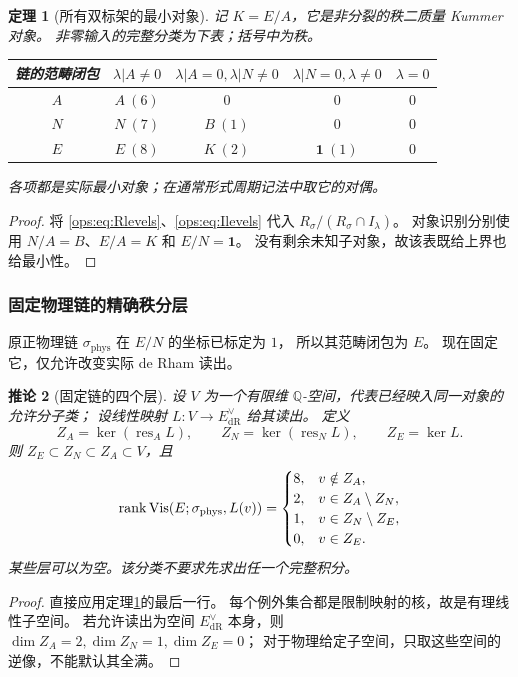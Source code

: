 \documentclass[11pt,a4paper,oneside]{ctexart}
\theoremstyle{cnplain}
\newtheorem{theorem}{定理}[section]
\newtheorem{corollary}[theorem]{推论}
\theoremstyle{definition}
\theoremstyle{remark}
\newcommand{\Q}{\mathbb Q}
\newcommand{\rank}{\operatorname{rank}}
\newcommand{\dR}{\mathrm{dR}}
\numberwithin{equation}{section}
\begin{document}
\begin{theorem}[所有双标架的最小对象]\label{ops:thm:allframes}
记 $K=E/A$，它是非分裂的秩二质量 Kummer 对象。
非零输入的完整分类为下表；括号中为秩。
\begin{center}
\small
\begin{tabular}{c|cccc}
\toprule
链的范畴闭包&$\lambda|A\ne0$
 &$\lambda|A=0,\lambda|N\ne0$
 &$\lambda|N=0,\lambda\ne0$&$\lambda=0$\\
\midrule
$A$&$A\ (6)$&$0$&$0$&$0$\\
$N$&$N\ (7)$&$B\ (1)$&$0$&$0$\\
$E$&$E\ (8)$&$K\ (2)$&$\mathbf1\ (1)$&$0$\\
\bottomrule
\end{tabular}
\end{center}
各项都是实际最小对象；在通常形式周期记法中取它的对偶。
\end{theorem}
\begin{proof}
将 \eqref{ops:eq:Rlevels}、\eqref{ops:eq:Ilevels} 代入
$R_\sigma/(R_\sigma\cap I_\lambda)$。
对象识别分别使用 $N/A=B$、$E/A=K$ 和 $E/N=\mathbf1$。
没有剩余未知子对象，故该表既给上界也给最小性。
\end{proof}

\subsubsection{固定物理链的精确秩分层}
原正物理链 $\sigma_{\mathrm{phys}}$ 在 $E/N$ 的坐标已标定为 $1$，
所以其范畴闭包为 $E$。
现在固定它，仅允许改变实际 de Rham 读出。
\begin{corollary}[固定链的四个层]\label{ops:cor:numerators}
设 $V$ 为一个有限维 $\Q$-空间，代表已经映入同一对象的允许分子类；
设线性映射 $L:V\to E_{\dR}^{\vee}$ 给其读出。
定义
\begin{equation}\label{ops:eq:exceptional}
 Z_A=\ker(\operatorname{res}_A L),\qquad
 Z_N=\ker(\operatorname{res}_N L),\qquad Z_E=\ker L.
\end{equation}
则 $Z_E\subset Z_N\subset Z_A\subset V$，且
\begin{equation}\label{ops:eq:rankstrata}
 \rank\Vis(E;\sigma_{\mathrm{phys}},L(v))=
 \begin{cases}
 8,&v\notin Z_A,\\
 2,&v\in Z_A\setminus Z_N,\\
 1,&v\in Z_N\setminus Z_E,\\
 0,&v\in Z_E.
 \end{cases}
\end{equation}
某些层可以为空。该分类不要求先求出任一个完整积分。
\end{corollary}
\begin{proof}
直接应用定理\ref{ops:thm:allframes}的最后一行。
每个例外集合都是限制映射的核，故是有理线性子空间。
若允许读出为空间 $E_{\dR}^{\vee}$ 本身，则
$\dim Z_A=2,\dim Z_N=1,\dim Z_E=0$；
对于物理给定子空间，只取这些空间的逆像，不能默认其全满。
\end{proof}
\end{document}
